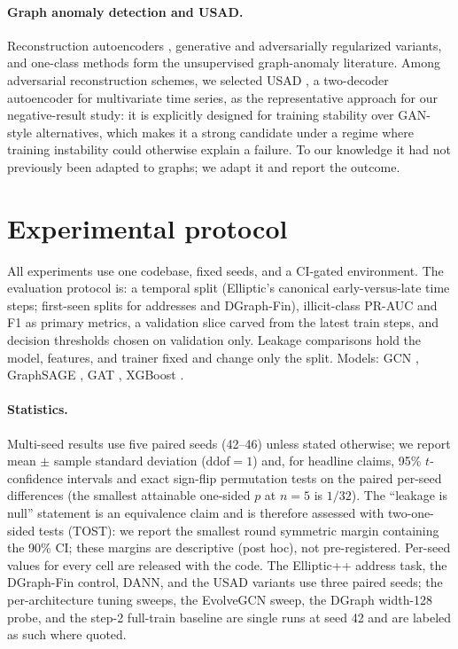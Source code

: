 \documentclass[10pt]{article}
\begin{document}
\paragraph{Graph anomaly detection and USAD.} Reconstruction autoencoders
\citep{ding2019dominant}, generative and adversarially regularized variants, and
one-class methods form the unsupervised graph-anomaly literature. Among
adversarial reconstruction schemes, we selected USAD \citep{audibert2020usad}, a
two-decoder autoencoder for multivariate time series, as the representative
approach for our negative-result study: it is explicitly designed for training
stability over GAN-style alternatives, which makes it a strong candidate under a
regime where training instability could otherwise explain a failure. To our
knowledge it had not previously been adapted to graphs; we adapt it and report
the outcome.

\section{Experimental protocol}
\label{sec:protocol}
All experiments use one codebase, fixed seeds, and a CI-gated environment.
The evaluation protocol is: a temporal split (Elliptic's canonical early-versus-late
time steps; first-seen splits for addresses and DGraph-Fin), illicit-class PR-AUC
and F1 as primary metrics, a validation slice carved from the latest train steps,
and decision thresholds chosen on validation only. Leakage comparisons hold the
model, features, and trainer fixed and change only the split. Models: GCN
\citep{kipf2017gcn}, GraphSAGE \citep{hamilton2017graphsage}, GAT
\citep{velickovic2018gat}, XGBoost \citep{chen2016xgboost}.

\paragraph{Statistics.} Multi-seed results use five paired seeds (42--46) unless
stated otherwise; we report mean $\pm$ sample standard deviation (ddof$=1$) and,
for headline claims, 95\% $t$-confidence intervals and exact sign-flip permutation
tests on the paired per-seed differences (the smallest attainable one-sided $p$ at
$n{=}5$ is $1/32$). The ``leakage is null'' statement is an equivalence claim and
is therefore assessed with two-one-sided tests (TOST): we report the smallest
round symmetric margin containing the 90\% CI; these margins are descriptive
(post hoc), not pre-registered. Per-seed values for every cell are released with
the code. The Elliptic++ address task, the DGraph-Fin control, DANN, and the USAD
variants use three paired seeds; the per-architecture tuning sweeps, the EvolveGCN
sweep, the DGraph width-128 probe, and the step-2 full-train baseline are single
runs at seed 42 and are labeled as such where quoted.
\end{document}
